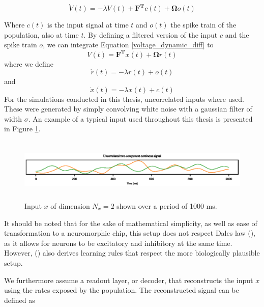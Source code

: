 \documentclass[twoside,11pt]{article}
\begin{document}
\begin{equation} \label{voltage_dynamic_diff}
    \dot{V}(t) = -\lambda V(t) + \mathbf{F^T}c(t) + \mathbf{\Omega} o(t) 
\end{equation}

Where $c(t)$ is the input signal at time $t$ and $o(t)$ the spike train of the population, also at
time $t$. By defining a filtered version of the input $c$ and the spike train $o$, we can integrate Equation \ref{voltage_dynamic_diff}
to
\begin{equation} \label{voltage_dynamic_explicit}
    V(t) = \mathbf{F^T}x(t) + \mathbf{\Omega} r(t)
\end{equation}
where we define
\begin{equation} \label{rate_diff}
    \dot{r}(t) = -\lambda r(t) + o(t)
\end{equation}
and 
\begin{equation} \label{input_diff}
    \dot{x}(t) = -\lambda x(t) + c(t)
\end{equation}
For the simulations conducted in this thesis, uncorrelated inputs where used. These were generated
by simply convolving white noise with a gaussian filter of width $\sigma$. An example of a typical
input used throughout this thesis is presented in Figure \ref{fig:input}.

\begin{figure}[!htb]
    \includegraphics[width = \columnwidth, height=3cm]{figures/input.eps}
    \caption{Input $x$ of dimension $N_x = 2$ shown over a period of 1000 ms.}
    \label{fig:input}
\end{figure}

It should be noted that for the sake of mathematical simplicity, as well as ease of
transformation to a neuromorphic chip, this setup does not respect Dales law (\cite{Dale1935}), as it
allows for neurons to be excitatory and inhibitory at the same time. However, (\cite{wiel2017learning})
also derives learning rules that respect the more biologically plausible setup.

We furthermore assume a readout layer, or decoder, that reconstructs the input $x$ using
the rates exposed by the population. The reconstructed signal can be defined as
\end{document}
